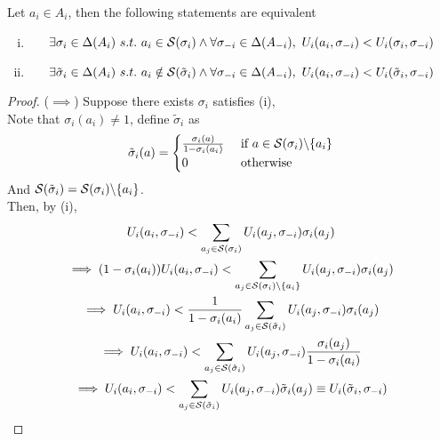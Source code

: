 \documentclass[11pt]{article}
\begin{document}
		\begin{proposition}
			Let $a_i \in A_i$, then the following statements are equivalent
			\begin{enumerate}[(i)]
				\item \begin{equation}
					\exists \sigma_i \in \Delta(A_i)\ s.t.\ a_i \in \mc{S}(\sigma_i) \land 
					\forall \sigma_{-i} \in \Delta(A_{-i}),\ U_i(a_i, \sigma_{-i}) < U_i(\sigma_i, \sigma_{-i})
				\end{equation}
				\item \begin{equation}
					\exists \tilde{\sigma}_i \in \Delta(A_i)\ s.t.\ a_i \notin \mathcal{{S}}(\tilde{\sigma}_i) \land
					\forall \sigma_{-i} \in \Delta(A_{-i}),\ U_i(a_i, \sigma_{-i}) < U_i(\tilde{\sigma}_i, \sigma_{-i})
				\end{equation}
			\end{enumerate}
			\begin{proof}
				($\implies$) Suppose there exists $\sigma_i$ satisfies (i), \\
				Note that $\sigma_i(a_i) \neq 1$, define $\tilde{\sigma}_i$ as 
				\begin{equation}
					\tilde{\sigma}_i(a) = \begin{cases}
						\frac{\sigma_i(a)}{1 - \sigma_i(a_i)} &\text{{ if }} a \in \mathcal{{S}}(\sigma_i) \backslash \{a_i\} \\
						0 &\text{{ otherwise}}
					\end{cases}
				\end{equation}
				And $\mathcal{{S}}(\tilde{\sigma}_i) = \mathcal{{S}}(\sigma_i) \backslash \{a_i\}$.\\
				Then, by (i), 
				\begin{gather}
					U_i(a_i, \sigma_{-i}) < \sum_{a_j \in \mc{S}(\sigma_i)} U_i(a_j, \sigma_{-i})\sigma_i(a_j) \\
					\implies (1 - \sigma_i(a_i)) U_i(a_i, \sigma_{-i}) < \sum_{a_j \in \mc{S}(\sigma_i) \backslash \{a_i\}} U_i(a_j, \sigma_{-i})\sigma_i(a_j) \\
					\implies U_i(a_i, \sigma_{-i}) < \frac{1}{1 - \sigma_i(a_i)} \sum_{a_j \in \mc{S}(\tilde{\sigma}_i)} U_i(a_j, \sigma_{-i})\sigma_i(a_j) \\
					\implies U_i(a_i, \sigma_{-i}) < \sum_{a_j \in \mc{S}(\tilde{\sigma}_i)} U_i(a_j, \sigma_{-i}) \frac{\sigma_i(a_j)}{1 - \sigma_i(a_i)} \\
					\implies U_i(a_i, \sigma_{-i}) < \sum_{a_j \in \mc{S}(\tilde{\sigma}_i)} U_i(a_j, \sigma_{-i}) \tilde{\sigma}_i(a_j) \equiv U_i(\tilde{\sigma}_i, \sigma_{-i})

\end{gather}
\end{proof}
\end{proposition}
\end{document}
